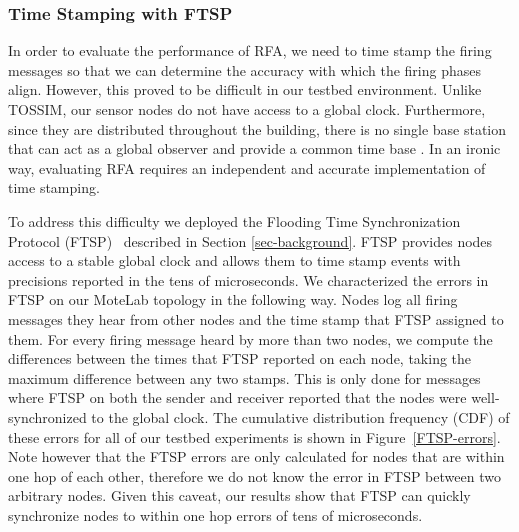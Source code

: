 \documentclass{sig-alternate}
\begin{document}
{\subsubsection{Time Stamping with FTSP}
\label{FTSP}

In order to evaluate the performance of RFA, we need to time stamp the
firing messages so that we can determine the accuracy with which the
firing phases align. However, this proved to be difficult in our
testbed environment. Unlike TOSSIM, our sensor nodes do not
have access to a global clock. Furthermore, since they are distributed
throughout the building, there is no single base station that can act
as a global observer and provide a common time base \cite{ftsp}. In an
ironic way, evaluating RFA requires an independent and accurate
implementation of time stamping.



To address this difficulty we deployed the Flooding Time
Synchronization Protocol (FTSP)~\cite{ftsp} described in Section
\ref{sec-background}. FTSP provides nodes access to a stable global
clock and allows them to time stamp events with precisions reported in
the tens of microseconds. We characterized the errors in FTSP on our
MoteLab topology in the following way. Nodes log all firing messages
they hear from other nodes and the time stamp that FTSP assigned to
them. For every firing message heard by more than two nodes, we
compute the differences between the times that FTSP reported on each
node, taking the maximum difference between any two stamps. This is
only done for messages where FTSP on both the sender and receiver
reported that the nodes were well-synchronized to the global
clock. The cumulative distribution frequency (CDF) of these errors for
all of our testbed experiments is shown in
Figure~\ref{FTSP-errors}. Note however that the FTSP errors are only
calculated for nodes that are within one hop of each other, therefore we
do not know the error in FTSP between two arbitrary nodes. Given this
caveat, our results show that FTSP can quickly synchronize nodes to
within one hop errors of tens of microseconds.

}
\end{document}
